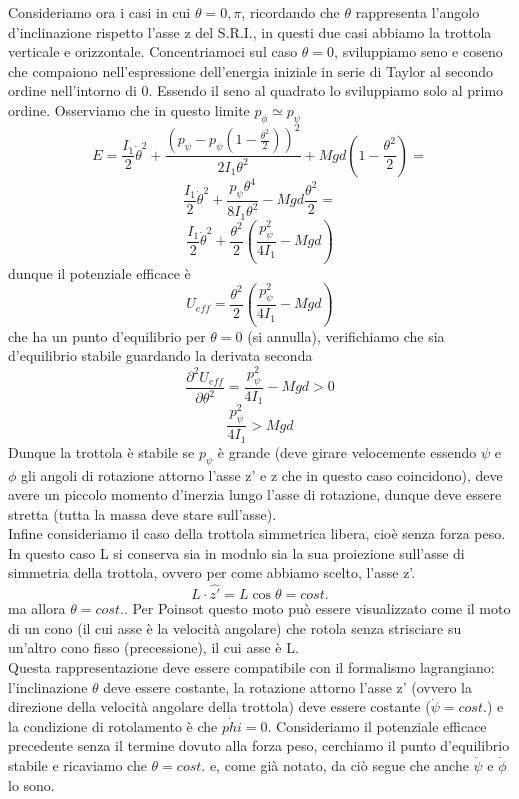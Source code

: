 \documentclass[
10pt, %
a4paper, %
oneside, %
headinclude,footinclude, %
BCOR5mm, %
]{scrartcl}
\begin{document}
Consideriamo ora i casi in cui \(\theta=0, \pi\), ricordando che $\theta$ rappresenta l'angolo d'inclinazione rispetto l'asse z del S.R.I., in questi due casi abbiamo la trottola verticale e orizzontale. Concentriamoci sul caso $\theta = 0$, sviluppiamo seno e coseno che compaiono nell'espressione dell'energia iniziale in serie di Taylor al secondo ordine nell'intorno di 0. Essendo il seno al quadrato lo sviluppiamo solo al primo ordine. Osserviamo che in questo limite \(p_\phi\simeq p_\psi\)
\[E = \frac{I_1}{2}\dot{\theta}^2+\frac{(p_\psi-p_\psi(1-\frac{\theta^2}{2}))^2}{2I_1\theta^2} +Mgd(1-\frac{\theta^2}{2}) = \]
\[\frac{I_1}{2}\dot{\theta}^2+\frac{p_\psi{\theta^4}}{8I_1\theta^2} -Mgd\frac{\theta^2}{2} =\]
\[\frac{I_1}{2}\dot{\theta}^2+\frac{\theta^2}{2}\left(\frac{p^2_\psi}{4I_1}-Mgd\right)\]
dunque il potenziale efficace è
\[U_{eff} = \frac{\theta^2}{2}\left(\frac{p^2_\psi}{4I_1}-Mgd\right)\]
che ha un punto d'equilibrio per \(\theta = 0\) (si annulla), verifichiamo che sia d'equilibrio stabile guardando la derivata seconda
\[\frac{\partial^2 U_{eff}}{\partial \theta^2}= \frac{p^2_\psi}{4I_1}-Mgd>0 \]
\[\frac{p^2_\psi}{4I_1}>Mgd\]
Dunque la trottola è stabile se \(p_\psi\) è grande (deve girare velocemente essendo $\psi$ e $\phi$ gli angoli di rotazione attorno l'asse z' e z che in questo caso coincidono), deve avere un piccolo momento d'inerzia lungo l'asse di rotazione, dunque deve essere stretta (tutta la massa deve stare sull'asse).\\
Infine consideriamo il caso della trottola simmetrica libera, cioè senza forza peso. In questo caso L si conserva sia in modulo sia la sua proiezione sull'asse di simmetria della trottola, ovvero per come abbiamo scelto, l'asse z'. \[L\cdot \hat{z'} = L\cos\theta = cost.\]
ma allora $\theta = cost.$. Per Poinsot questo moto può essere visualizzato come il moto di un cono (il cui asse è la velocità angolare) che rotola senza strisciare su un'altro cono fisso (precessione), il cui asse è L.\\
Questa rappresentazione deve essere compatibile con il formalismo lagrangiano: l'inclinazione $\theta$ deve essere costante, la rotazione attorno l'asse z' (ovvero la direzione della velocità angolare della trottola) deve essere costante (\(\dot{\psi} = cost.\)) e la condizione di rotolamento è che $\dot{phi} = 0$. Consideriamo il potenziale efficace precedente senza il termine dovuto alla forza peso, cerchiamo il punto d'equilibrio stabile e ricaviamo che $\theta= cost.$ e, come già notato, da ciò segue che anche $\dot{\psi}$ e $\dot{\phi}$ lo sono.
\end{document}
